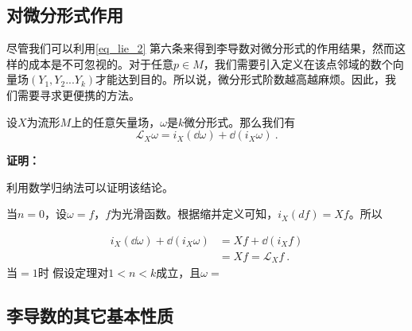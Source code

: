 \subsection{对微分形式作用}
尽管我们可以利用\autoref{eq_lie_2} 第六条来得到李导数对微分形式的作用结果，然而这样的成本是不可忽视的。对于任意$p\in M$，我们需要引入定义在该点邻域的数个向量场$(Y_1,Y_2...Y_k)$才能达到目的。所以说，微分形式阶数越高越麻烦。因此，我们需要寻求更便携的方法。
\begin{theorem}{}
设$X$为流形$M$上的任意矢量场，$\omega$是$k$微分形式。那么我们有
\begin{equation}
\mathcal L_X\omega=i_X(\dd \omega)+\dd(i_X\omega)~.
\end{equation}
\end{theorem}
\textbf{证明：}

利用数学归纳法可以证明该结论。

当$n=0$，设$\omega=f$，$f$为光滑函数。根据缩并定义可知，$i_X(df)=Xf$。所以

\begin{equation}
\begin{aligned}
i_X(\dd \omega)+\dd(i_X\omega)&=Xf+\dd(i_Xf)\\
&=Xf=\mathcal L_Xf~.
\end{aligned}
\end{equation}
当$=1$时
假设定理对$1<n<k$成立，且$\omega=$

\subsection{李导数的其它基本性质}
